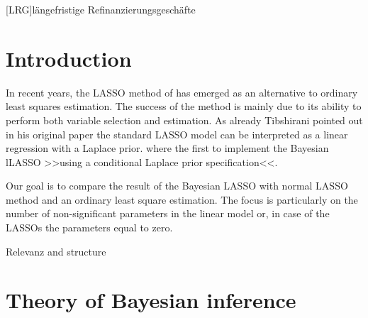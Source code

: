 \documentclass[12pt,a4paper]{article}
\begin{document}
\begin{adjustwidth}{1.5em}{0pt}

\begin{acronym}[dummyyyy]
 [LRG]{längefristige Refinanzierungsgeschäfte}

\end{acronym}

\end{adjustwidth}

\restoregeometry

\newpage
{} %

\hypertarget{introduction}{%
\section{Introduction}\label{introduction}}

In recent years, the \ac{LASSO} method of
\textcite{tibshirani_regression_1996} has emerged as an alternative to
ordinary least squares estimation. The success of the method is mainly
due to its ability to perform both variable selection and estimation. As
already Tibshirani pointed out in his original paper the standard
\ac{LASSO} model can be interpreted as a linear regression with a
Laplace prior. \textcite{park_bayesian_2008} where the first to
implement the Bayesian l\ac{LASSO} \textgreater\textgreater using a
conditional Laplace prior specification\textless\textless.

Our goal is to compare the result of the Bayesian \ac{LASSO} with normal
\ac{LASSO} method and an ordinary least square estimation. The focus is
particularly on the number of non-significant parameters in the linear
model or, in case of the \acp{LASSO} the parameters equal to zero.

Relevanz and structure

\newpage

\hypertarget{theory-of-bayesian-inference}{%
\section{Theory of Bayesian
inference}\label{theory-of-bayesian-inference}}
\end{document}
